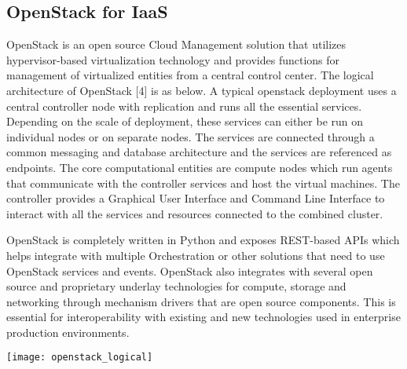 \subsection{OpenStack for IaaS}

OpenStack is an open source Cloud Management solution that utilizes hypervisor-based virtualization technology and provides functions for management of virtualized entities from a central control center. The logical architecture of OpenStack [4] is as below. A typical openstack deployment uses a central controller node with replication and runs all the essential services. Depending on the scale of deployment, these services can either be run on individual nodes or on separate nodes. The services are connected through a common messaging and database architecture and the services are referenced as endpoints. The core computational entities are compute nodes which run agents that communicate with the controller services and host the virtual machines. The controller provides a Graphical User Interface and Command Line Interface to interact with all the services and resources connected to the combined cluster. 

OpenStack is completely written in Python and exposes REST-based APIs which helps integrate with multiple Orchestration or other solutions that need to use OpenStack services and events. OpenStack also integrates with several open source and proprietary underlay technologies for compute, storage and networking through mechanism drivers that are open source components. This is essential for interoperability with existing and new technologies used in enterprise production environments.

\texttt{[image: openstack\_logical]}
